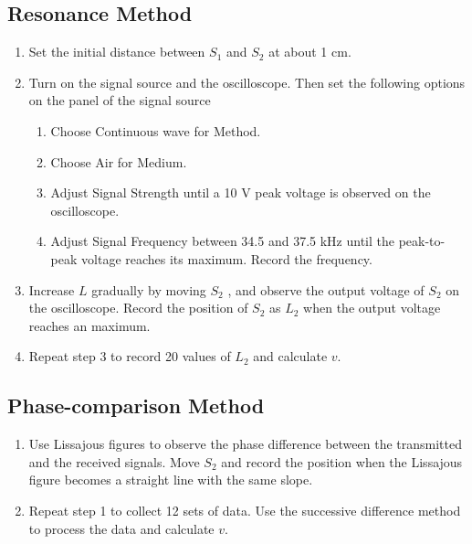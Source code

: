 \documentclass{article}
\begin{document}
\subsection{Resonance Method}

\begin{enumerate}
\item
Set the initial distance between $S_1$ and $S_2$ at about 1 cm.
\item
Turn on the signal source and the oscilloscope. Then set the following options on
the panel of the signal source
\begin{enumerate}[(1)]
	\item
	Choose Continuous wave for Method.
	\item
	Choose Air for Medium.
	\item
	Adjust Signal Strength until a 10 V peak voltage is observed on the oscilloscope.
	\item
	Adjust Signal Frequency between 34.5 and 37.5 kHz until the peak-to-peak voltage reaches its maximum. Record the frequency.
\end{enumerate}
\item
Increase $L$ gradually by moving $S_2$ , and observe the output voltage of $S_2$ on the
oscilloscope. Record the position of $S_2$ as $L_2$ when the output voltage reaches an
maximum.
\item
Repeat step 3 to record 20 values of $L_2$ and calculate $v$.
\end{enumerate}

\subsection{Phase-comparison Method}
\begin{enumerate}
\item
Use Lissajous figures to observe the phase difference between the transmitted and
the received signals. Move $S_2$ and record the position when the Lissajous figure
becomes a straight line with the same slope.
\item
Repeat step 1 to collect 12 sets of data. Use the successive difference method to
process the data and calculate $v$.
\end{enumerate}
\end{document}
